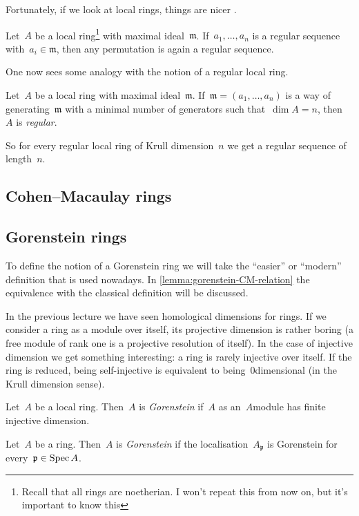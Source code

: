 \documentclass[10pt,a4paper]{article}
\begin{document}
Fortunately, if we look at local rings, things are nicer \cite[corollary 17.2]{eisenbud-commutative-algebra}.
\begin{corollary}
  Let~$A$ be a local ring\footnote{Recall that all rings are noetherian. I won't repeat this from now on, but it's important to know this} with maximal ideal~$\mathfrak{m}$. If~$a_1,\dotsc,a_n$ is a regular sequence with~$a_i\in\mathfrak{m}$, then any permutation is again a regular sequence.
\end{corollary}
One now sees some analogy with the notion of a regular local ring.
\begin{definition}
  Let~$A$ be a local ring with maximal ideal~$\mathfrak{m}$. If~$\mathfrak{m}=(a_1,\dotsc,a_n)$ is a way of generating~$\mathfrak{m}$ with a minimal number of generators such that~$\dim A=n$, then~$A$ is \emph{regular}.
\end{definition}
So for every regular local ring of Krull dimension~$n$ we get a regular sequence of length~$n$.

\subsection{Cohen--Macaulay rings}

\subsection{Gorenstein rings}
To define the notion of a Gorenstein ring we will take the ``easier'' or ``modern'' definition that is used nowadays. In \cref{lemma:gorenstein-CM-relation} the equivalence with the classical definition will be discussed.

In the previous lecture we have seen homological dimensions for rings. If we consider a ring as a module over itself, its projective dimension is rather boring (a free module of rank one is a projective resolution of itself). In the case of injective dimension we get something interesting: a ring is rarely injective over itself. If the ring is reduced, being self-injective is equivalent to being~$0$\dash dimensional (in the Krull dimension sense).

\begin{definition}
  Let~$A$ be a local ring. Then~$A$ is \emph{Gorenstein} if~$A$ as an~$A$\dash module has finite injective dimension.
  
  Let~$A$ be a ring. Then~$A$ is \emph{Gorenstein} if the localisation~$A_{\mathfrak{p}}$ is Gorenstein for every~$\mathfrak{p}\in\operatorname{Spec} A$.
\end{definition}
\end{document}
